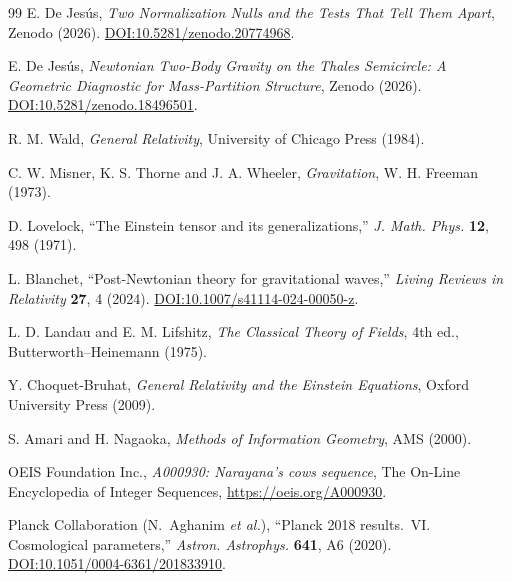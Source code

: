 \documentclass[11pt,a4paper]{article}
\theoremstyle{definition}
\theoremstyle{plain}
\theoremstyle{remark}
\begin{document}
\begin{thebibliography}{99}
E. De Jes\'us, \emph{Two Normalization Nulls and the Tests That Tell Them
Apart}, Zenodo (2026).
\href{https://doi.org/10.5281/zenodo.20774968}{DOI:10.5281/zenodo.20774968}.

E. De Jes\'us, \emph{Newtonian Two-Body Gravity on the Thales Semicircle: A
Geometric Diagnostic for Mass-Partition Structure}, Zenodo (2026).
\href{https://doi.org/10.5281/zenodo.18496501}{DOI:10.5281/zenodo.18496501}.

R. M. Wald, \emph{General Relativity}, University of Chicago Press (1984).

C. W. Misner, K. S. Thorne and J. A. Wheeler, \emph{Gravitation},
W. H. Freeman (1973).

D. Lovelock, ``The Einstein tensor and its generalizations,''
\emph{J. Math. Phys.} \textbf{12}, 498 (1971).

L. Blanchet, ``Post-Newtonian theory for gravitational waves,''
\emph{Living Reviews in Relativity} \textbf{27}, 4 (2024).
\href{https://doi.org/10.1007/s41114-024-00050-z}{DOI:10.1007/s41114-024-00050-z}.

L. D. Landau and E. M. Lifshitz, \emph{The Classical Theory of Fields}, 4th ed.,
Butterworth--Heinemann (1975).

Y. Choquet-Bruhat, \emph{General Relativity and the Einstein Equations},
Oxford University Press (2009).

S. Amari and H. Nagaoka, \emph{Methods of Information Geometry}, AMS (2000).

OEIS Foundation Inc., \emph{A000930: Narayana's cows sequence}, The On-Line
Encyclopedia of Integer Sequences, \url{https://oeis.org/A000930}.

Planck Collaboration (N.~Aghanim \emph{et al.}), ``Planck 2018 results.~VI.
Cosmological parameters,'' \emph{Astron. Astrophys.} \textbf{641}, A6 (2020).
\href{https://doi.org/10.1051/0004-6361/201833910}{DOI:10.1051/0004-6361/201833910}.

\end{thebibliography}
\end{document}
